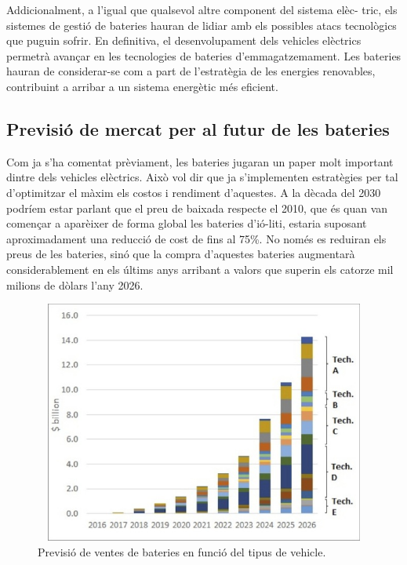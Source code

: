 Addicionalment, a l'igual que qualsevol altre component del sistema elèc- \newline tric, els sistemes de gestió de bateries hauran de lidiar amb els possibles atacs tecnològics que puguin sofrir. En definitiva, el desenvolupament dels vehicles elèctrics permetrà avançar en les tecnologies de bateries \newline d'emmagatzemament. Les bateries hauran de considerar-se com a part de l'estratègia de les energies renovables, contribuint a arribar a un sistema energètic més eficient.

\subsection{Previsió de mercat per al futur de les bateries}

Com ja s'ha comentat prèviament, les bateries jugaran un paper molt important dintre dels vehicles elèctrics. Això vol dir que ja s'implementen estratègies per tal d'optimitzar el màxim els costos i rendiment d'aquestes. A la dècada del 2030 podríem estar parlant que el preu de baixada respecte el 2010, que és quan van començar a aparèixer de forma global les bateries d'ió-liti, estaria suposant aproximadament una reducció de cost de fins al 75\%. No només es reduiran els preus de les bateries, sinó que la compra \newline d'aquestes bateries augmentarà considerablement en els últims anys arribant a valors que superin els catorze mil milions de dòlars l'any 2026.
\begin{figure}[H]
		\centering
    	\includegraphics[width=13cm, height=8cm]{Marcteoric/ventabateries2026.jpg}
     	\caption{Previsió de ventes de bateries en funció del tipus de vehicle.} 
\end{figure}

